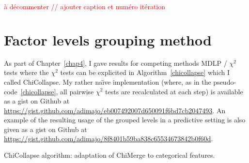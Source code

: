 \textcolor{red}{à décommenter // ajouter caption  et numéro itération}


\section{Factor levels grouping method} \label{app1:chicollapse}

As part of Chapter~\ref{chap4}, I gave results for competing methods MDLP / $\chi^2$ tests where the $\chi^2$ tests can be explicited in Algorithm~\ref{chicollapse} which I called ChiCollapse. My rather na{\"\i}ve implementation (where, as in the pseudo-code~\ref{chicollapse}, all pairwise $\chi^2$ tests are recalculated at each step) is available as a gist on Github at \url{https://gist.github.com/adimajo/eb007492007d650091f6bd7cb2047493}. An example of the resulting usage of the grouped levels in a predictive setting is also given as a gist on Github at \url{https://gist.github.com/adimajo/8f8401b59ba838c65534673842b0f60d}.

\begin{algorithm}[H]
 \KwResult{$\hat{\q}$}
 \caption{\label{chicollapse} ChiCollapse algorithm: adaptation of ChiMerge to categorical features.}
\end{algorithm}





